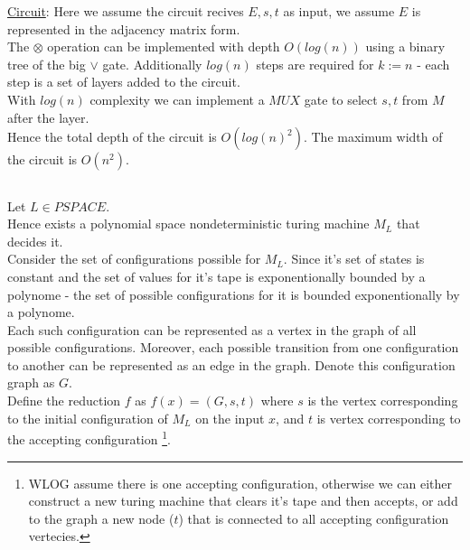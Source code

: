 \underline{Circuit}:
Here we assume the circuit recives $E,s,t$ as input, we assume $E$ is represented
in the adjacency matrix form.\\
The $\otimes$ operation can be implemented with depth $O(log(n))$
using a binary tree of the big $\vee$ gate.
Additionally $log(n)$ steps are required for $k:=n$ - each step
is a set of layers added to the circuit.\\
With $log(n)$ complexity we can implement a $MUX$ gate
to select $s,t$ from $M$ after the layer.\\
Hence the total depth of the circuit is $O(log(n)^2)$.
The maximum width of the circuit is $O(n^2)$.

\subsection{}
Let $L\in PSPACE$.\\
Hence exists a polynomial space nondeterministic turing machine $M_L$ that decides it.\\
Consider the set of configurations possible for $M_L$.
Since it's set of states is constant and the set of values for
it's tape is exponentionally bounded by a polynome - 
the set of possible configurations for it is bounded
exponentionally by a polynome.\\

Each such configuration can be represented as a vertex
in the graph of all possible configurations.
Moreover, each possible transition from one configuration to another
can be represented as an edge in the graph.
Denote this configuration graph as $G$.\\

Define the reduction $f$ as $f(x)=(G, s, t)$
where $s$ is the vertex corresponding to the initial
configuration of $M_L$ on the input $x$, and $t$
is vertex corresponding to the accepting configuration
\footnote{
	WLOG assume there is one accepting configuration,
	otherwise we can either construct a new turing
	machine that clears it's tape and then accepts,
	or add to the graph a new node ($t$) that
	is connected to all accepting configuration vertecies.
}.